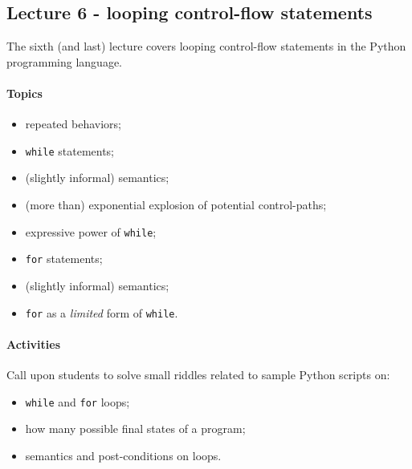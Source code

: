 			\subsection{Lecture 6 - looping control-flow statements}
				The sixth (and last) lecture covers looping control-flow statements in the Python programming language.

				\paragraph*{Topics}
					\begin{itemize}
						\item repeated behaviors;
						\item \texttt{while} statements;
						\item (slightly informal) semantics;
						\item (more than) exponential explosion of potential control-paths;
						\item expressive power of \texttt{while};
						\item \texttt{for} statements;
						\item (slightly informal) semantics;
						\item \texttt{for} as a \textit{limited} form of \texttt{while}.
					\end{itemize}

				\paragraph*{Activities}
					Call upon students to solve small riddles related to sample Python scripts on:

					\begin{itemize}
						\item \texttt{while} and \texttt{for} loops;
						\item how many possible final states of a program;
						\item semantics and post-conditions on loops.
					\end{itemize}
